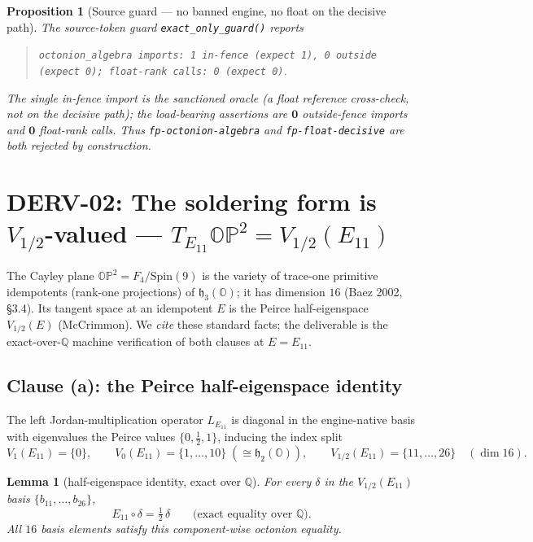 \documentclass[11pt]{article}
\newcommand{\hO}{\mathfrak{h}_3(\mathbb{O})}
\newcommand{\OP}{\mathbb{OP}^2}
\newcommand{\Eoneone}{E_{11}}
\newcommand{\Vhalf}{V_{1/2}}
\newcommand{\jord}{\circ}
\newtheorem{lemma}{Lemma}
\newtheorem{proposition}{Proposition}
\begin{document}
\begin{proposition}[Source guard --- no banned engine, no float on the decisive
path]
\label{prop:guard}
The source-token guard \texttt{exact\_only\_guard()} reports
\begin{quote}
\texttt{octonion\_algebra imports: 1 in-fence (expect 1), 0 outside (expect 0);
float-rank calls: 0 (expect 0)}.
\end{quote}
The single in-fence import is the sanctioned oracle (a float reference
cross-check, \emph{not} on the decisive path); the load-bearing assertions are
$\mathbf{0}$ outside-fence imports and $\mathbf{0}$ float-rank calls. Thus
\texttt{fp-octonion-algebra} and \texttt{fp-float-decisive} are both rejected by
construction.
\end{proposition}

\section{DERV-02: The soldering form is $\Vhalf$-valued ---
$T_{\Eoneone}\OP=\Vhalf(\Eoneone)$}
\label{sec:derv02}

The Cayley plane $\OP=F_4/\mathrm{Spin}(9)$ is the variety of trace-one primitive
idempotents (rank-one projections) of $\hO$; it has dimension $16$ (Baez
2002, \S 3.4). Its tangent space at an idempotent $E$ is the Peirce
half-eigenspace $\Vhalf(E)$ (McCrimmon). We \emph{cite} these standard facts; the
deliverable is the exact-over-$\mathbb{Q}$ machine verification of both clauses at
$E=\Eoneone$.

\subsection{Clause (a): the Peirce half-eigenspace identity}
The left Jordan-multiplication operator $L_{\Eoneone}$ is diagonal in the
engine-native basis with eigenvalues the Peirce values $\{0,\tfrac12,1\}$,
inducing the index split
\begin{equation}
V_1(\Eoneone)=\{0\},\qquad
V_0(\Eoneone)=\{1,\dots,10\}\;(\cong\mathfrak{h}_2(\mathbb{O})),\qquad
\Vhalf(\Eoneone)=\{11,\dots,26\}\quad(\dim 16).
\end{equation}

\begin{lemma}[half-eigenspace identity, exact over $\mathbb{Q}$]
\label{lem:half}
For every $\delta$ in the $\Vhalf(\Eoneone)$ basis $\{b_{11},\dots,b_{26}\}$,
\begin{equation}
\Eoneone\jord\delta=\tfrac12\,\delta
\qquad\text{(exact equality over }\mathbb{Q}\text{)} .
\end{equation}
All $16$ basis elements satisfy this component-wise octonion equality.
\end{lemma}
\end{document}
